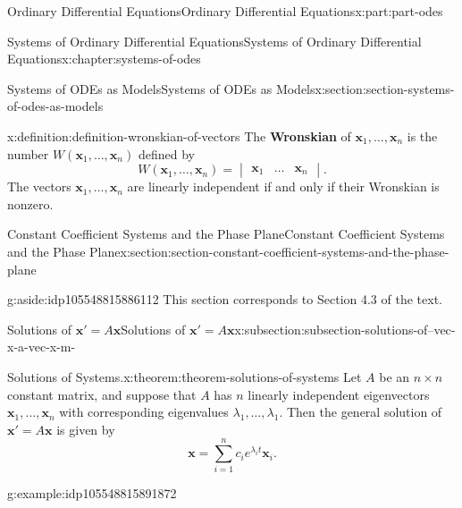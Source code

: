 \documentclass[twoside,10pt,]{book}
\newcommand{\terminology}[1]{\textbf{#1}}
\numberwithin{equation}{part}
\renewcommand{\vec}[1]{\mathbf{#1}}
\newcommand{\amp}{&}
\begin{document}
\begin{partptx}{Ordinary Differential Equations}{}{Ordinary Differential Equations}{}{}{x:part:part-odes}
\begin{chapterptx}{Systems of Ordinary Differential Equations}{}{Systems of Ordinary Differential Equations}{}{}{x:chapter:systems-of-odes}
\begin{sectionptx}{Systems of ODEs as Models}{}{Systems of ODEs as Models}{}{}{x:section:section-systems-of-odes-as-models}
\begin{definition}{}{x:definition:definition-wronskian-of-vectors}%
%
The \terminology{Wronskian} of \(\vec{x}_{1},\dots,\vec{x}_{n}\) is the number \(W(\vec{x}_{1},\dots,\vec{x}_{n})\) defined by%
\begin{equation*}
W(\vec{x}_{1},\dots,\vec{x}_{n}) = \begin{vmatrix}\vec{x}_{1}  \amp  \dots   \amp  \vec{x}_{n}\end{vmatrix}.
\end{equation*}
The vectors \(\vec{x}_{1},\dots,\vec{x}_{n}\) are linearly independent if and only if their Wronskian is nonzero.%
\end{definition}
\end{sectionptx}
%
%
\typeout{************************************************}
\typeout{************************************************}
%
\begin{sectionptx}{Constant Coefficient Systems and the Phase Plane}{}{Constant Coefficient Systems and the Phase Plane}{}{}{x:section:section-constant-coefficient-systems-and-the-phase-plane}
\begin{introduction}{}%
\begin{aside}{}{g:aside:idp105548815886112}%
This section corresponds to Section 4.3 of the text.%
\end{aside}
\end{introduction}%
%
%
\typeout{************************************************}
\typeout{Subsection  Solutions of \(\vec{x}' = A\vec{x}\)}
\typeout{************************************************}
%
\begin{subsectionptx}{Solutions of \(\vec{x}' = A\vec{x}\)}{}{Solutions of \(\vec{x}' = A\vec{x}\)}{}{}{x:subsection:subsection-solutions-of--vec-x-a-vec-x-m-}
\begin{theorem}{Solutions of Systems.}{}{x:theorem:theorem-solutions-of-systems}%
Let \(A\) be an \(n\times n\) constant matrix, and suppose that \(A\) has \(n\) linearly independent eigenvectors \(\vec{x}_{1},\dots,\vec{x}_{n}\) with corresponding eigenvalues \(\lambda_{1},\dots,\lambda_{1}\). Then the general solution of \(\vec{x}'=A\vec{x}\) is given by%
\begin{equation*}
\vec{x} = \sum_{i=1}^{n}c_{i}e^{\lambda_{i}t}\vec{x}_{i}.
\end{equation*}
%
\end{theorem}
\begin{example}{}{g:example:idp105548815891872}%

\end{example}
\end{subsectionptx}
\end{sectionptx}
\end{chapterptx}
\end{partptx}
\end{document}

